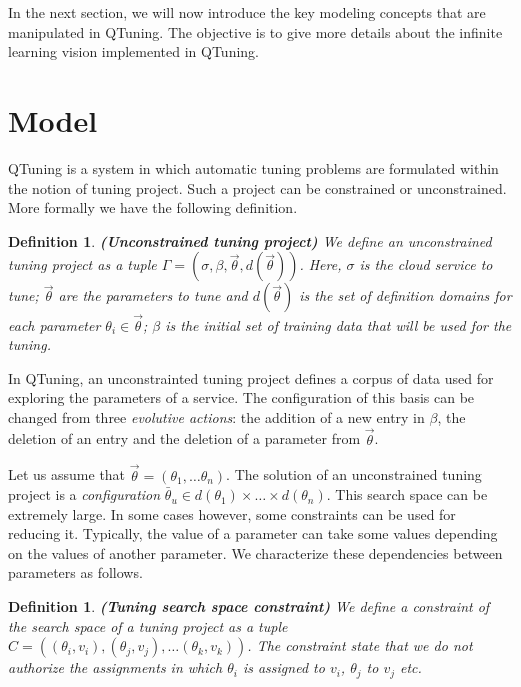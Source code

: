 \documentclass[10pt, conference, compsocconf]{IEEEtran}
\newtheorem{definition}[theorem]{Definition}
\begin{document}
In the next section, we will now introduce the key modeling concepts that are manipulated in QTuning. The objective is to 
give more details about the infinite learning vision implemented in QTuning. 


\section{Model} \label{Model}

QTuning is a system in which automatic tuning problems are formulated within the notion of tuning project.  Such  
a project can be  constrained or unconstrained. More formally we have the following definition.

\begin{definition}{\bf (Unconstrained tuning project)}
We define an unconstrained tuning project as a tuple $ \Gamma = (\sigma, \beta, \vec{\theta}, d(\vec{\theta}))$. Here, $\sigma$ is the cloud service to tune; 
$\vec{\theta}$ are the parameters to tune and $d(\vec{\theta})$ is the set of definition domains for each parameter 
$\theta_i \in \vec{\theta}$; $\beta$ is the initial set of training data that will be used for the tuning.
\end{definition}

In QTuning, an unconstrainted tuning project defines a corpus of data used for exploring the parameters of a service. 
The configuration of this basis can be changed from three {\it evolutive actions}: the addition of a new entry in $\beta$, 
the deletion of an entry and the deletion of a parameter from $\vec{\theta}$. 

Let us assume that $\vec{\theta} = (\theta_1,\dots \theta_n)$. 
The solution of an unconstrained tuning project is a {\it configuration} $\bar{\theta}_u \in d(\theta_1) \times \dots  \times d(\theta_n)$. 
This search space can be extremely large. In some cases however, some constraints can be used for reducing it. Typically, the 
value of a parameter can take some values depending on the values of another parameter. 
We characterize these dependencies between parameters as follows. 

\begin{definition}{\bf (Tuning search space constraint)}
We define a constraint of the search space of a tuning project as a tuple $C = ((\theta_i, v_i), (\theta_j, v_j),\dots (\theta_k, v_k))$. 
The constraint state that we do not authorize the  assignments in which $\theta_i$ is assigned to $v_i$, $\theta_j$ to $v_j$ etc.
\end{definition}
\end{document}

